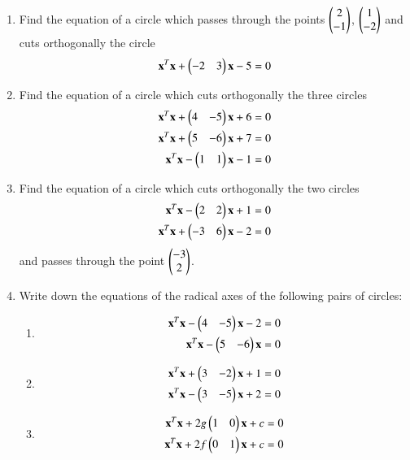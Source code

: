 \renewcommand{\theequation}{\theenumi}
\begin{enumerate}[label=\arabic*.,ref=\thesubsection.\theenumi]
\item Find the equation of a circle which passes through the points $\begin{pmatrix}2\\-1\end{pmatrix}$, $\begin{pmatrix}1\\-2\end{pmatrix}$ and cuts orthogonally the circle
\begin{align}
\mathbf{x}^T\mathbf{x}+\begin{pmatrix}-2 & 3\end{pmatrix}\mathbf{x}-5 = 0
\end{align}
\item Find the equation of a circle which cuts orthogonally the three circles
\begin{align}
\mathbf{x}^T\mathbf{x}+\begin{pmatrix}4 & -5\end{pmatrix}\mathbf{x}+6 = 0
\\
\mathbf{x}^T\mathbf{x}+\begin{pmatrix}5 & -6\end{pmatrix}\mathbf{x}+7 = 0
\\
\mathbf{x}^T\mathbf{x}-\begin{pmatrix}1 & 1\end{pmatrix}\mathbf{x}-1 = 0
\end{align}
\item Find the equation of a circle which cuts orthogonally the two circles
\begin{align}
\mathbf{x}^T\mathbf{x}-\begin{pmatrix}2 & 2\end{pmatrix}\mathbf{x}+1 = 0
\\
\mathbf{x}^T\mathbf{x}+\begin{pmatrix}-3 & 6\end{pmatrix}\mathbf{x}-2 = 0
\end{align}
and passes through the point $\begin{pmatrix}-3\\2\end{pmatrix}$.
\item Write down the equations of the radical axes of the following pairs of circles:
\begin{enumerate}
\item
%
\begin{align}
\mathbf{x}^T\mathbf{x}-\begin{pmatrix}4 & -5\end{pmatrix}\mathbf{x}-2 = 0
\\
\mathbf{x}^T\mathbf{x}-\begin{pmatrix}5 & -6\end{pmatrix}\mathbf{x} = 0
\end{align}
%
\item
\begin{align}
%
\vec{x}^T\vec{x}+\myvec{3 & -2}\vec{x}+1 = 0
\\
\vec{x}^T\vec{x}-\myvec{3 & -5}\vec{x}+2 = 0
\end{align}
%
\item
\begin{align}
%
\vec{x}^T\vec{x}+2g\myvec{1 & 0}\vec{x}+c = 0
\\
\vec{x}^T\vec{x}+2f\myvec{0 & 1}\vec{x}+c = 0
\end{align}
%
\end{enumerate}
\solution


\end{enumerate}
